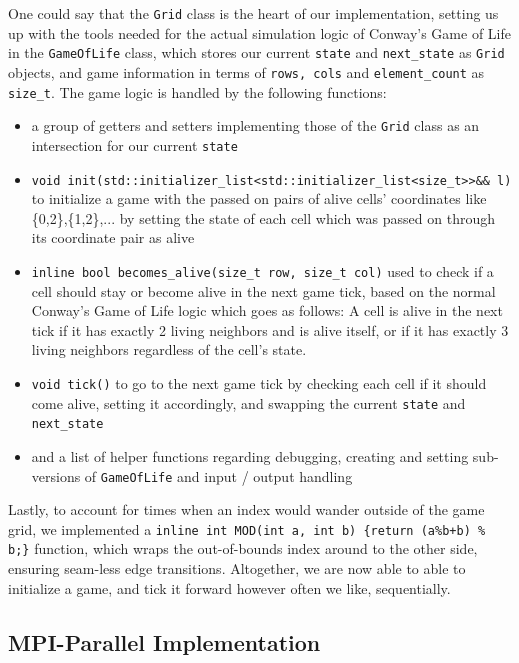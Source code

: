 \documentclass[11pt]{article}
\begin{document}
One could say that the \texttt{Grid} class is the heart of our implementation, setting us up with the tools needed for the actual simulation logic of Conway's Game of Life in the \texttt{GameOfLife} class, which stores our current \texttt{state} and \texttt{next\_state} as \texttt{Grid} objects, and game information in terms of \texttt{rows, cols} and \texttt{element\_count} as \texttt{size\_t}. The game logic is handled by the following functions:
\begin{itemize}
    \item a group of getters and setters implementing those of the \texttt{Grid} class as an intersection for our current \texttt{state}
    \item \texttt{void init(std::initializer\_list<std::initializer\_list<size\_t>>\&\& l)} to initialize a game with the passed on pairs of alive cells' coordinates like \{0,2\},\{1,2\},... by setting the state of each cell which was passed on through its coordinate pair as alive
    \item \texttt{inline bool becomes\_alive(size\_t row, size\_t col)} used to check if a cell should stay or become alive in the next game tick, based on the normal Conway's Game of Life logic which goes as follows: A cell is alive in the next tick if it has exactly 2 living neighbors and is alive itself, or if it has exactly 3 living neighbors regardless of the cell's state.
    \item \texttt{void tick()} to go to the next game tick by checking each cell if it should come alive, setting it accordingly, and swapping the current \texttt{state} and \texttt{next\_state}
    \item and a list of helper functions regarding debugging, creating and setting sub-versions of \texttt{GameOfLife} and input / output handling
\end{itemize}

Lastly, to account for times when an index would wander outside of the game grid, we implemented a \texttt{inline int MOD(int a, int b) \{return (a\%b+b) \% b;\}} function, which wraps the out-of-bounds index around to the other side, ensuring seam-less edge transitions. 
Altogether, we are now able to able to initialize a game, and tick it forward however often we like, sequentially.

\subsection{MPI-Parallel Implementation}
\end{document}
